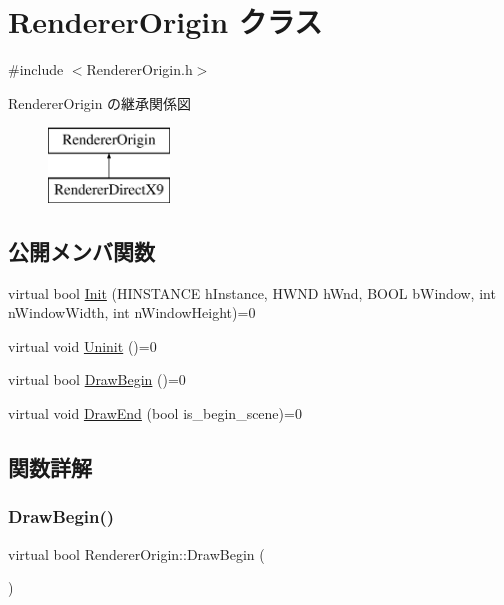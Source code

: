 \hypertarget{class_renderer_origin}{}\section{Renderer\+Origin クラス}
\label{class_renderer_origin}


{\ttfamily \#include $<$Renderer\+Origin.\+h$>$}

Renderer\+Origin の継承関係図\begin{figure}[H]
\begin{center}
\leavevmode
\includegraphics[height=2.000000cm]{class_renderer_origin}
\end{center}
\end{figure}
\subsection*{公開メンバ関数}
\begin{DoxyCompactItemize}
\item 
virtual bool \mbox{\hyperlink{class_renderer_origin_aa143bcff2fb88499f58ed11729b94818}{Init}} (H\+I\+N\+S\+T\+A\+N\+CE h\+Instance, H\+W\+ND h\+Wnd, B\+O\+OL b\+Window, int n\+Window\+Width, int n\+Window\+Height)=0
\item 
virtual void \mbox{\hyperlink{class_renderer_origin_ac3635770d5d681fe42940fab32bb83cb}{Uninit}} ()=0
\item 
virtual bool \mbox{\hyperlink{class_renderer_origin_ad9679ced65560b4c31ffce56460d06d6}{Draw\+Begin}} ()=0
\item 
virtual void \mbox{\hyperlink{class_renderer_origin_aa9a839fc8b7704a34ed62b1f3f8f3596}{Draw\+End}} (bool is\+\_\+begin\+\_\+scene)=0
\end{DoxyCompactItemize}


\subsection{関数詳解}
\mbox{\label{class_renderer_origin_ad9679ced65560b4c31ffce56460d06d6}} 
\subsubsection{\texorpdfstring{Draw\+Begin()}{DrawBegin()}}
{\footnotesize\ttfamily virtual bool Renderer\+Origin\+::\+Draw\+Begin (\begin{DoxyParamCaption}{ }\end{DoxyParamCaption})\hspace{0.3cm}{\ttfamily [pure virtual]}}



